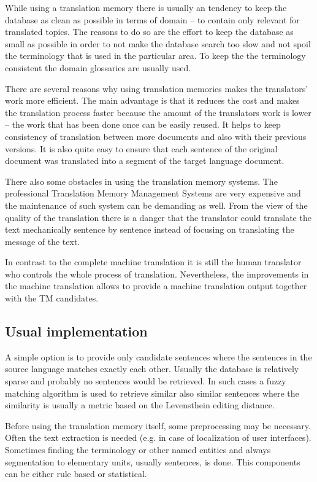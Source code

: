 While using a translation memory there is usually an tendency to keep the database as clean as possible in terms of domain -- to contain only relevant for translated topics. The reasons to do so are the effort to keep the database as small as possible in order to not make the database search too slow and not spoil the terminology that is used in the particular area. To keep the the terminology consistent the domain glossaries are usually used.

There are several reasons why using translation memories makes the translators' work more efficient. The main advantage is that it reduces the cost and makes the translation process faster because the amount of the translators work is lower -- the work that has been done once can be easily reused. It helps to keep consistency of translation between more documents and also with their previous versions. It is also quite easy to ensure that each sentence of the original document was translated into a segment of the target language document.

There also some obstacles in using the translation memory systems. The professional Translation Memory Management Systems are very expensive and the maintenance of such system can be demanding as well. From the view of the quality of the translation there is a danger that the translator could translate the text mechanically sentence by sentence instead of focusing on translating the message of the text.

In contrast to the complete machine translation it is still the human translator who controls the whole process of translation. Nevertheless, the improvements in the machine translation allows to provide a machine translation output together with the TM candidates.

\subsection{Usual implementation}

A simple option is to provide only candidate sentences where the sentences in the source language matches exactly each other. Usually the database is relatively sparse and probably no sentences would be retrieved. In such cases a fuzzy matching algorithm is used to retrieve similar also similar sentences where the similarity is usually a metric based on the Levensthein editing distance.

Before using the translation memory itself, some preprocessing may be necessary. Often the text extraction is needed (e.g. in case of localization of user interfaces). Sometimes finding the terminology or other named entities and always segmentation to elementary units, usually sentences, is done. This components can be either rule based or statistical. 


